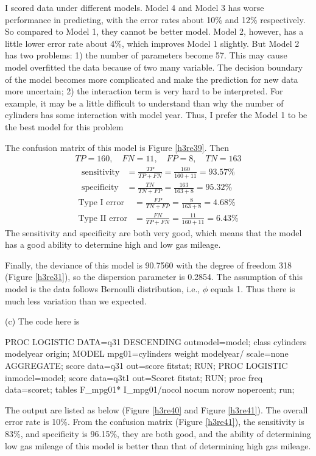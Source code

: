 \documentclass[letterpaper, 12pt]{article}
\newcommand{\ba}{$$\begin{aligned}}
\newcommand{\ea}{\end{aligned}$$}
\begin{document}
I scored data under different models. Model 4 and Model 3 has worse performance in predicting, with the error rates about 10\% and 12\% respectively. So compared to Model 1, they cannot be better model. Model 2, however, has a little lower error rate about 4\%, which improves Model 1 slightly. But Model 2 has two problems: 1) the number of parameters become 57. This may cause model overfitted the data because of two many variable. The decision boundary of the model becomes more complicated and make the prediction for new data more uncertain; 2) the interaction term is very hard to be interpreted. For example, it may be a little difficult to understand than why the number of cylinders has some interaction with model year. Thus, I prefer the Model 1 to be the best model for this problem

The confusion matrix of this model is Figure \ref{h3re39}. Then
\ba
TP=160,\quad FN=11,\quad FP=8,\quad TN=163
\ea
\ba
\text{sensitivity}&=\frac{TP}{TP+FN}=\frac{160}{160+11}=93.57\%\\
\text{specificity}&=\frac{TN}{TN+FP}=\frac{163}{163+8}=95.32\%
\ea
\ba
\text{Type I error}&=\frac{FP}{TN+FP}=\frac{8}{163+8}=4.68\%\\
\text{Type II error}&=\frac{FN}{TP+FN}=\frac{11}{160+11}=6.43\%
\ea
The sensitivity and specificity are both very good, which means that the model has a good ability to determine high and low gas mileage.


Finally, the deviance of this model is 90.7560 with the degree of freedom 318 (Figure \ref{h3re31}), so the dispersion parameter is 0.2854. The assumption of this model is the data follows Bernoulli distribution, i.e., $\phi$ equals 1. Thus there is much less variation than we expected.

(c) The code here is 
\begin{Sascode}[store=class]
PROC LOGISTIC DATA=q31 DESCENDING outmodel=model;
class cylinders modelyear origin;
MODEL mpg01=cylinders weight modelyear/ scale=none AGGREGATE;
score data=q31 out=score fitstat;
RUN;
PROC LOGISTIC inmodel=model;
score data=q3t1 out=Scoret fitstat;
RUN;
proc freq data=scoret;
tables F_mpg01* I_mpg01/nocol nocum norow nopercent;
run;
\end{Sascode}

The output are listed as below (Figure \ref{h3re40} and Figure \ref{h3re41}). The overall error rate is 10\%. From the confusion matrix (Figure \ref{h3re41}), the sensitivity is 83\%, and specificity is 96.15\%, they are both good, and the ability of determining low gas mileage of this model is better than that of determining high gas mileage.
\end{document}
